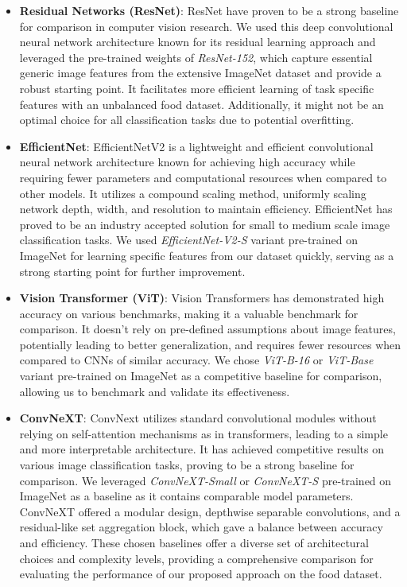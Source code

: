 \documentclass{article}
\begin{document}
\begin{itemize}
  \item \textbf{Residual Networks (ResNet)}: ResNet \cite{Kaiming2016} have proven to be a strong baseline for comparison in computer vision research. We used this deep convolutional neural network architecture known for its residual learning approach and leveraged the pre-trained weights of \textit{ResNet-152}, which capture essential generic image features from the extensive ImageNet dataset and provide a robust starting point. It facilitates more efficient learning of task specific features with an unbalanced food dataset. Additionally, it might not be an optimal choice for all classification tasks due to potential overfitting.
  \item \textbf{EfficientNet}: EfficientNetV2 \cite{Tan2019,Tan2021} is a lightweight and efficient convolutional neural network architecture known for achieving high accuracy while requiring fewer parameters and computational resources when compared to other models. It utilizes a compound scaling method, uniformly scaling network depth, width, and resolution to maintain efficiency. EfficientNet has proved to be an industry accepted solution for small to medium scale image classification tasks. We used \textit{EfficientNet-V2-S} variant pre-trained on ImageNet for learning specific features from our dataset quickly, serving as a strong starting point for further improvement.
  \item \textbf{Vision Transformer (ViT)}: Vision Transformers \cite{Dosovitskiy2021} has demonstrated high accuracy on various benchmarks, making it a valuable benchmark for comparison. It doesn’t rely on pre-defined assumptions about image features, potentially leading to better generalization, and requires fewer resources when compared to CNNs of similar accuracy. We chose \textit{ViT-B-16} or \textit{ViT-Base} variant pre-trained on ImageNet as a competitive baseline for comparison, allowing us to benchmark and validate its effectiveness.
  \item \textbf{ConvNeXT}: ConvNext \cite{Liu2022} utilizes standard convolutional modules without relying on self-attention mechanisms as in transformers, leading to a simple and more interpretable architecture. It has achieved competitive results on various image classification tasks, proving to be a strong baseline for comparison. We leveraged \textit{ConvNeXT-Small} or \textit{ConvNeXT-S} pre-trained on ImageNet as a baseline as it contains comparable model parameters. ConvNeXT offered a modular design, depthwise separable convolutions, and a residual-like set aggregation block, which gave a balance between accuracy and efficiency. These chosen baselines offer a diverse set of architectural choices and complexity levels, providing a comprehensive comparison for evaluating the performance of our proposed approach on the food dataset.
\end{itemize}
\end{document}
